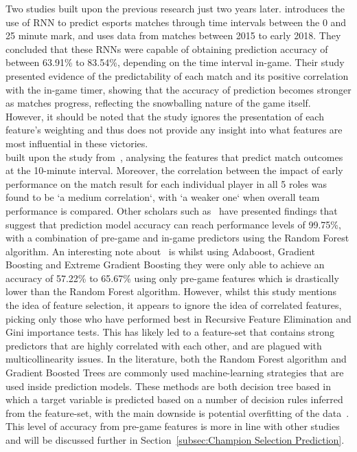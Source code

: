 Two studies built upon the previous research just two years later.
\citet{silva2018continuous} introduces the use of \ac{RNN} to predict esports matches through time intervals between the 0 and 25 minute mark, and uses data from matches between 2015 to early 2018.
They concluded that these \ac{RNN}s were capable of obtaining prediction accuracy of between 63.91\% to 83.54\%, depending on the time interval in-game.
Their study presented evidence of the predictability of each match and its positive correlation with the in-game timer, showing that the accuracy of prediction becomes stronger as matches progress, reflecting the snowballing nature of the game itself.
However, it should be noted that the study ignores the presentation of each feature's weighting and thus does not provide any insight into what features are most influential in these victories. \\

\citet{gaina2018league} built upon the study from~\citet{lin2016league}, analysing the features that predict match outcomes at the 10-minute interval.
Moreover, the correlation between the impact of early performance on the match result for each individual player in all 5 roles was found to be `a medium correlation`, with `a weaker one` when overall team performance is compared.
Other scholars such as~\citet{ani2019victory} have presented findings that suggest that prediction model accuracy can reach performance levels of 99.75\%, with a combination of pre-game and in-game predictors using the Random Forest algorithm.
An interesting note about~\citet{ani2019victory} is whilst using Adaboost, Gradient Boosting and Extreme Gradient Boosting they were only able to achieve an accuracy of 57.22\% to 65.67\% using only pre-game features which is drastically lower than the Random Forest algorithm.
However, whilst this study mentions the idea of feature selection, it appears to ignore the idea of correlated features, picking only those who have performed best in Recursive Feature Elimination and Gini importance tests.
This has likely led to a feature-set that contains strong predictors that are highly correlated with each other, and are plagued with multicollinearity issues.
In the literature, both the Random Forest algorithm and Gradient Boosted Trees are commonly used machine-learning strategies that are used inside prediction models.
These methods are both decision tree based in which a target variable is predicted based on a number of decision rules inferred from the feature-set, with the main downside is potential overfitting of the data~\citep{scikitDecisionTrees}.
This level of accuracy from pre-game features is more in line with other studies and will be discussed further in Section~\ref{subsec:Champion Selection Prediction}. \\

